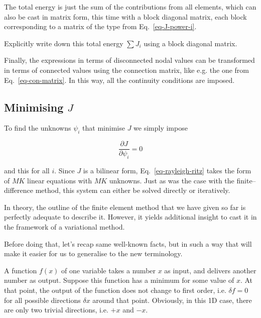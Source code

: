 The total energy is just the sum of the contributions from all elements, which can also be cast in matrix form, this time with a block diagonal matrix, each block corresponding to a matrix of the type from Eq.~\ref{eq-J-power-i}.

\begin{exer}
Explicitly write down this total energy $\sum J_i$ using a block diagonal matrix.
\end{exer}

Finally, the expressions in terms of disconnected nodal values can be transformed in terms of connected values using the connection matrix, like e.g. the one from Eq.~\ref{eq-con-matrix}. In this way, all the continuity conditions are imposed.

\subsection{Minimising $J$}

To find the unknowns $\psi_i$ that minimise $J$ we simply impose

\begin{equation}
\frac{\partial J}{\partial \psi_i} = 0 \label{eq-rayleigh-ritz}
\end{equation} 

and this for all $i$. Since $J$ is a bilinear form, Eq.~\ref{eq-rayleigh-ritz} takes the form of $MK$ linear equations with $MK$ unknowns. Just as was the case with the finite--difference method, this system can either be solved directly or iteratively.


\pagebreak



In theory, the outline of the finite element method that we have given so far is perfectly adequate to describe it. However, it yields additional insight to cast it in the framework of a variational method.

Before doing that, let's recap same well-known facts, but in such a way that will make it easier for us to generalise to the new terminology.

A function $f(x)$ of one variable takes a number $x$ as input, and delivers another number as output. Suppose this function has a minimum for some value of $x$. At that point, the output of the function does not change to first order, i.e. $\delta f=0$ for all possible directions $\delta x$ around that point. Obviously, in this 1D case, there are only two trivial directions, i.e. $+x$ and $-x$.

